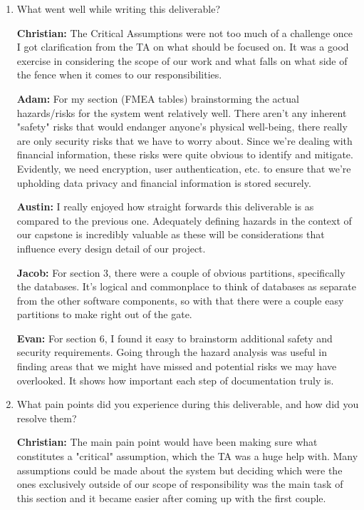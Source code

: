 \documentclass{article}
\begin{document}
\begin{enumerate}
    \item What went well while writing this deliverable? 

    \textbf{Christian:} The Critical Assumptions were not too much of a challenge once I got clarification from the TA on what should be focused on. It was a good exercise in considering the scope of our work and what falls on what side of the fence when it comes to our responsibilities.

    \textbf{Adam:} For my section (FMEA tables) brainstorming the actual hazards/risks for the system went relatively well. There aren't any inherent "safety" risks that would endanger anyone's physical well-being, there really are only security risks that we have to worry about. Since we're dealing with financial information, these risks were quite obvious to identify and mitigate. Evidently, we need encryption, user authentication, etc. to ensure that we're upholding data privacy and financial information is stored securely.

    \textbf{Austin:} I really enjoyed how straight forwards this deliverable is as compared to the previous one. Adequately defining hazards in the context of our capstone is incredibly valuable as these will be considerations that influence every design detail of our project.
    
    \textbf{Jacob:} For section 3, there were a couple of obvious partitions, specifically the databases. It's logical and commonplace to think of databases as separate from the other software components, so with that there were a couple easy partitions to make right out of the gate.

    \textbf{Evan:} For section 6, I found it easy to brainstorm additional safety and security requirements. Going through the hazard analysis was useful in finding areas that we might have missed and potential risks we may have overlooked. It shows how important each step of documentation truly is.
    
    \item What pain points did you experience during this deliverable, and how
    did you resolve them?

    \textbf{Christian:} The main pain point would have been making sure what constitutes a "critical" assumption, which the TA was a huge help with. Many assumptions could be made about the system but deciding which were the ones exclusively outside of our scope of responsibility was the main task of this section and it became easier after coming up with the first couple.


\end{enumerate}
\end{document}
